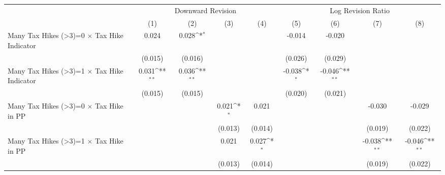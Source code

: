 {
\def\sym#1{\ifmmode^{#1}\else\(^{#1}\)\fi}
\begin{tabular}{l*{8}{c}}
\toprule
                    &\multicolumn{4}{c}{Downward Revision}                                                  &\multicolumn{4}{c}{Log Revision Ratio}                                                 \\\cmidrule(lr){2-5}\cmidrule(lr){6-9}
                    &\multicolumn{1}{c}{(1)}         &\multicolumn{1}{c}{(2)}         &\multicolumn{1}{c}{(3)}         &\multicolumn{1}{c}{(4)}         &\multicolumn{1}{c}{(5)}         &\multicolumn{1}{c}{(6)}         &\multicolumn{1}{c}{(7)}         &\multicolumn{1}{c}{(8)}         \\
\midrule
Many Tax Hikes (>3)=0 $\times$ Tax Hike Indicator&       0.024         &       0.028\sym{*}  &                     &                     &      -0.014         &      -0.020         &                     &                     \\
                    &     (0.015)         &     (0.016)         &                     &                     &     (0.026)         &     (0.029)         &                     &                     \\
Many Tax Hikes (>3)=1 $\times$ Tax Hike Indicator&       0.031\sym{**} &       0.036\sym{**} &                     &                     &      -0.038\sym{*}  &      -0.046\sym{**} &                     &                     \\
                    &     (0.015)         &     (0.015)         &                     &                     &     (0.020)         &     (0.021)         &                     &                     \\
Many Tax Hikes (>3)=0 $\times$ Tax Hike in PP&                     &                     &       0.021\sym{*}  &       0.021         &                     &                     &      -0.030         &      -0.029         \\
                    &                     &                     &     (0.013)         &     (0.014)         &                     &                     &     (0.019)         &     (0.022)         \\
Many Tax Hikes (>3)=1 $\times$ Tax Hike in PP&                     &                     &       0.021         &       0.027\sym{*}  &                     &                     &      -0.038\sym{**} &      -0.046\sym{**} \\
                    &                     &                     &     (0.013)         &     (0.014)         &                     &                     &     (0.019)         &     (0.022)         \\

\end{tabular}}
